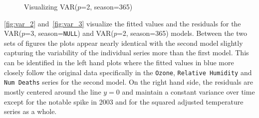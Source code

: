 \documentclass{article}\usepackage[]{graphicx}\usepackage[]{color}
\newenvironment{knitrout}{}{} %
\begin{document}
\begin{knitrout}
\color{fgcolor}\begin{figure}[H]

{\centering {}

}

\caption[Visualizing VAR($p$=2, season=365)]{Visualizing VAR($p$=2, season=365)}\label{fig:var_3}
\end{figure}


\end{knitrout}

\autoref{fig:var_2} and~\autoref{fig:var_3} visualize the fitted values and the residuals for the VAR($p$=3, season=\texttt{NULL}) and VAR($p$=2, season=365) models. Between the two sets of figures the plots appear nearly identical with the second model slightly capturing the variability of the individual series more than the first model. This can be identified in the left hand plots where the fitted values in blue more closely follow the original data specifically in the \texttt{Ozone}, \texttt{Relative Humidity} and \texttt{Num Deaths} series for the second model. On the right hand side, the residuals are mostly centered around the line $y=0$ and maintain a constant variance over time except for the notable spike in 2003 and for the squared adjusted temperature series as a whole. 
\end{document}
